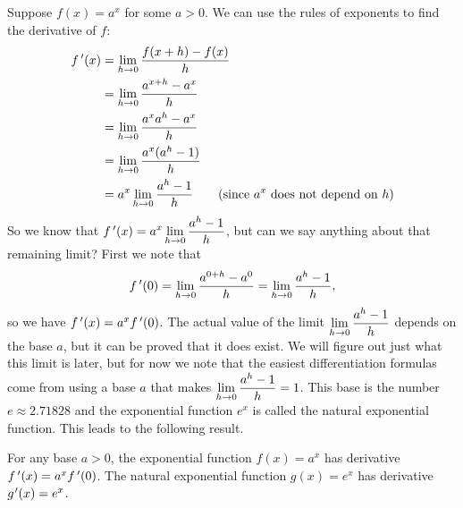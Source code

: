 Suppose $f(x)=a^x$ for some $a>0$. We can use the rules of exponents to find the derivative of $f$:
\begin{align*}
	f\,'(x)
	&=\lim_{h\to 0}\frac{f(x+h)-f(x)}{h}\\
	&=\lim_{h\to 0}\frac{a^{x+h}-a^x}{h}\\
	&=\lim_{h\to 0}\frac{a^xa^h-a^x}{h}\\
	&=\lim_{h\to 0}\frac{a^x(a^h-1)}{h}\\
	&=a^x\lim_{h\to 0}\frac{a^h-1}{h} \qquad\text{(since $a^x$ does not depend on $h$)}\\
\end{align*}
So we know that $f\,'(x)=\displaystyle a^x \lim_{h\to 0}\frac{a^h-1}{h}$, but can we say anything about that remaining limit? First we note that
\[f\,'(0)=\lim_{h\to 0}\frac  {a^{0+h}-a^0}{h}=\lim_{h\to 0}\frac{a^h-1}{h},\]
so we have $f\,'(x)=a^xf\,'(0)$. The actual value of the limit $\displaystyle\lim_{h\to 0}\frac{a^h-1}{h}$ depends on the base $a$, but it can be proved that it does exist. We will figure out just what this limit is later, but for now we note that the easiest differentiation formulas come from using a base $a$ that makes $\displaystyle\lim_{h\to 0}\frac{a^h-1}{h}=1$. This base is the
number $e\approx 2.71828$ and the exponential function $e^x$ is called the natural exponential function. This leads to the following result.

\begin{theorem}\label{thm_baby_exp_deriv}%
For any base $a>0$, the exponential function $f(x)=a^x$ has derivative $f\,'(x)=a^xf\,'(0)$. The natural exponential function $g(x)=e^x$ has derivative $g\primeskip'(x)=e^x$.
\end{theorem}



